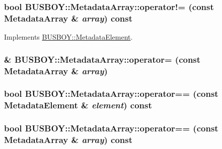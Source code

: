 \label{classBUSBOY_1_1MetadataArray_a781093b168f59ed77d378ead7cb3cc37}
\hypertarget{classBUSBOY_1_1MetadataArray_a62365009f5370b749639004ff5c93096}{
\subsubsection[{operator!=}]{\setlength{\rightskip}{0pt plus 5cm}bool BUSBOY::MetadataArray::operator!= (const {\bf MetadataArray} \& {\em array}) const}}
\label{classBUSBOY_1_1MetadataArray_a62365009f5370b749639004ff5c93096}


Implements \hyperlink{classBUSBOY_1_1MetadataElement_a9895dfd3f251e26e8d818871405ce4c7}{BUSBOY::MetadataElement}.\hypertarget{classBUSBOY_1_1MetadataArray_a59b946f07da7ab0ba83996a53b027561}{
\subsubsection[{operator=}]{ \& BUSBOY::MetadataArray::operator= (const {\bf MetadataArray} \& {\em array})}}
\label{classBUSBOY_1_1MetadataArray_a59b946f07da7ab0ba83996a53b027561}
\hypertarget{classBUSBOY_1_1MetadataArray_a55817c939be35da0f3ef10c164483169}{
\subsubsection[{operator==}]{\setlength{\rightskip}{0pt plus 5cm}bool BUSBOY::MetadataArray::operator== (const {\bf MetadataElement} \& {\em element}) const}}
\label{classBUSBOY_1_1MetadataArray_a55817c939be35da0f3ef10c164483169}
\hypertarget{classBUSBOY_1_1MetadataArray_a6105a539099289a76db6524c926ea551}{
\subsubsection[{operator==}]{\setlength{\rightskip}{0pt plus 5cm}bool BUSBOY::MetadataArray::operator== (const {\bf MetadataArray} \& {\em array}) const}}
\label{classBUSBOY_1_1MetadataArray_a6105a539099289a76db6524c926ea551}



